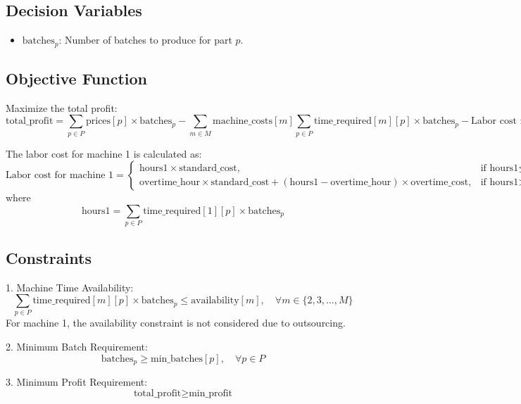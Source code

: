 \documentclass{article}
\begin{document}
\subsection*{Decision Variables}
\begin{itemize}
    \item \( \text{batches}_{p} \): Number of batches to produce for part \( p \).
\end{itemize}

\subsection*{Objective Function}
Maximize the total profit:
\[
\text{total\_profit} = \sum_{p \in P} \text{prices}[p] \times \text{batches}_{p} - \sum_{m \in M} \text{machine\_costs}[m] \sum_{p \in P} \text{time\_required}[m][p] \times \text{batches}_{p} - \text{Labor cost for machine 1}
\]

The labor cost for machine 1 is calculated as:
\[
\text{Labor cost for machine 1} = 
\begin{cases} 
\text{hours1} \times \text{standard\_cost}, & \text{if } \text{hours1} \leq \text{overtime\_hour} \\
\text{overtime\_hour} \times \text{standard\_cost} + (\text{hours1} - \text{overtime\_hour}) \times \text{overtime\_cost}, & \text{if } \text{hours1} > \text{overtime\_hour}
\end{cases}
\]
where 
\[
\text{hours1} = \sum_{p \in P} \text{time\_required}[1][p] \times \text{batches}_{p}
\]

\subsection*{Constraints}
1. Machine Time Availability:
   \[
   \sum_{p \in P} \text{time\_required}[m][p] \times \text{batches}_{p} \leq \text{availability}[m], \quad \forall m \in \{2, 3, \ldots, M\}
   \]
   For machine 1, the availability constraint is not considered due to outsourcing.

2. Minimum Batch Requirement:
   \[
   \text{batches}_{p} \geq \text{min\_batches}[p], \quad \forall p \in P
   \]

3. Minimum Profit Requirement:
   \[
   \text{total\_profit} \geq \text{min\_profit}
   \]
\end{document}
